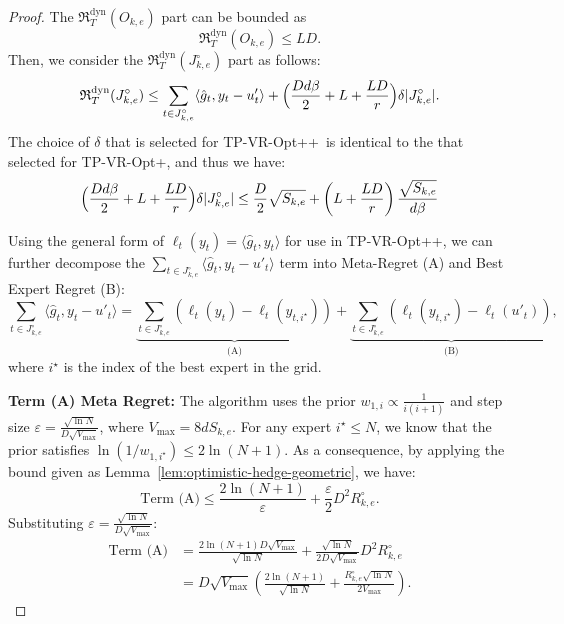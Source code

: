 \documentclass[journal,onecolumn]{IEEEtran}
\theoremstyle{plain}
\theoremstyle{definition}
\theoremstyle{remark}
\newcommand{\regret}{\mathfrak{R}}
\newcommand{\tpvrplus}{{\sc TP-VR-Opt+}}
\newcommand{\tpvrplusplus}{{\sc TP-VR-Opt++}}
\begin{document}
{\begin{proof}
The $\regret^{\mathrm{dyn}}_{T}(O_{k,e})$ part can be bounded as
\begin{equation*}
    \regret^{\mathrm{dyn}}_{T}(O_{k,e})\leq LD.
\end{equation*}
Then, we consider the $\regret^{\mathrm{dyn}}_{T}(J_{k,e}^{\circ})$ part as follows:
\begin{equation*}
 \regret^{\mathrm{dyn}}_{T}(J_{k,e}^{\circ}) \le\sum_{t \in J_{k,e}^{\circ}} \langle \hat{g}_t, y_t - u'_t \rangle+ \Bigl(\frac{Dd\beta}{2}+L+\frac{LD}{r}\Bigr)\delta |J_{k,e}^{\circ}|.
\end{equation*}
The choice of $\delta$ that is selected for \tpvrplusplus\, is identical to the that selected for \tpvrplus, and thus we have:
\begin{equation*}
    \Bigl(\frac{Dd\beta}{2}+L+\frac{LD}{r}\Bigr)\delta |J_{k,e}^{\circ}|\leq \frac{D}{2}\sqrt{S_{k,e}}+\left(L+\frac{LD}{r}\right)\frac{\sqrt{S_{k,e}}}{d\beta}
\end{equation*}


Using the general form of $\ell_t(y_t)=\langle \hat{g}_t, y_t\rangle$ for use in \tpvrplusplus, we can further decompose the $\sum_{t \in J_{k,e}^{\circ}} \langle \hat{g}_t, y_t - u'_t \rangle$ term into Meta-Regret (A) and Best Expert Regret (B):
\begin{equation*}
\sum_{t \in J_{k,e}^{\circ}} \langle \hat{g}_t, y_t - u'_t \rangle
= \underbrace{\sum_{t \in J_{k,e}^{\circ}} (\ell_t(y_t) - \ell_t(y_{t, i^\star}))}_{\text{(A)}} + \underbrace{\sum_{t \in J_{k,e}^{\circ}} (\ell_t(y_{t, i^\star}) - \ell_t(u'_t))}_{\text{(B)}},
\end{equation*}
where $i^\star$ is the index of the best expert in the grid.

\textbf{Term (A) Meta Regret:}
The algorithm uses the prior $w_{1,i} \propto \frac{1}{i(i+1)}$ and step size $\varepsilon=\frac{\sqrt{\ln N}}{D\sqrt{V_{\max}}}$, where $V_{\max}=8dS_{k,e}$. For any expert $i^\star \le N$, we know that the prior satisfies $\ln(1/w_{1,i^\star}) \le 2\ln(N+1)$. As a consequence, by applying the bound given as Lemma~\ref{lem:optimistic-hedge-geometric}, we have:
\begin{equation*}
\text{Term (A)} \le \frac{2\ln(N+1)}{\varepsilon} + \frac{\varepsilon}{2} D^2 R_{k,e}^{\circ}.
\end{equation*}
Substituting $\varepsilon = \frac{\sqrt{\ln N}}{D\sqrt{V_{\max}}}$:
\begin{align*}
\text{Term (A)} &= \frac{2\ln(N+1) D \sqrt{V_{\max}}}{\sqrt{\ln N}} + \frac{\sqrt{\ln N}}{2 D \sqrt{V_{\max}}} D^2 R_{k,e}^{\circ}
\\&= D \sqrt{V_{\max}} \left( \frac{2\ln(N+1)}{\sqrt{\ln N}} + \frac{R_{k,e}^{\circ} \sqrt{\ln N}}{2 V_{\max}} \right).
\end{align*}


\end{proof}}
\end{document}
